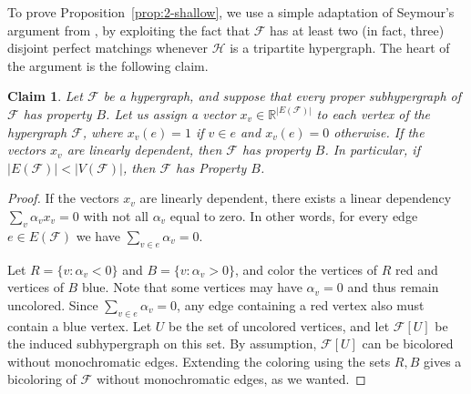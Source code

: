 \documentclass[11pt, a4paper]{article}
\numberwithin{theorem}{section} %
\newtheorem{claim}[theorem]{Claim}
\theoremstyle{remark}
\theoremstyle{definition}
\def\cF{\mathcal{F}}
\def\cH{\mathcal{H}}
\def\bR{\mathbb{R}}
\begin{document}
To prove Proposition~\ref{prop:2-shallow}, we use a simple adaptation of Seymour's argument from \cite{Seymour74}, by exploiting the fact that $\cF$ has at least two (in fact, three) disjoint perfect matchings whenever $\cH$ is a tripartite hypergraph. The heart of the argument is the following claim.

\begin{claim}\label{claim:minimal}
Let $\cF$ be a hypergraph, and suppose that every proper subhypergraph of $\cF$ has property $B$. Let us assign a vector $x_v\in \bR^{|E(\cF)|}$ to each vertex of the hypergraph $\cF$, where $x_v(e)=1$ if $v\in e$ and $x_v(e)=0$ otherwise. If the vectors $x_v$ are linearly dependent, then $\cF$ has property $B$. In particular, if $|E(\cF)|<|V(\cF)|$, then $\cF$ has Property $B$. 
\end{claim}
\begin{proof}
If the vectors $x_v$ are linearly dependent, there exists a linear dependency $\sum_{v} \alpha_v x_v=0$ with not all $\alpha_v$ equal to zero. In other words, for every edge $e\in E(\cF)$ we have $\sum_{v\in e} \alpha_v=0$.

Let $R=\{v:\alpha_v<0\}$ and $B=\{v:\alpha_v>0\}$, and color the vertices of $R$ red and vertices of $B$ blue. Note that some vertices may have $\alpha_v=0$ and thus remain uncolored. Since $\sum_{v\in e} \alpha_v=0$, any edge containing a red vertex also must contain a blue vertex. Let $U$ be the set of uncolored vertices, and let $\cF[U]$ be the induced subhypergraph on this set. By assumption, $\cF[U]$ can be bicolored without monochromatic edges. Extending the coloring using the sets $R, B$ gives a bicoloring of $\cF$ without monochromatic edges, as we wanted.
\end{proof}
\end{document}
